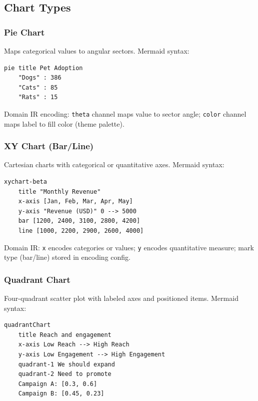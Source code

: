 \subsection{Chart Types}

\subsubsection{Pie Chart}

Maps categorical values to angular sectors. Mermaid syntax:

\begin{Verbatim}[fontsize=\small]
pie title Pet Adoption
    "Dogs" : 386
    "Cats" : 85
    "Rats" : 15
\end{Verbatim}

\noindent Domain IR encoding: \texttt{theta} channel maps value to sector angle;
\texttt{color} channel maps label to fill color (theme palette).

\subsubsection{XY Chart (Bar/Line)}

Cartesian charts with categorical or quantitative axes. Mermaid syntax:

\begin{Verbatim}[fontsize=\small]
xychart-beta
    title "Monthly Revenue"
    x-axis [Jan, Feb, Mar, Apr, May]
    y-axis "Revenue (USD)" 0 --> 5000
    bar [1200, 2400, 3100, 2800, 4200]
    line [1000, 2200, 2900, 2600, 4000]
\end{Verbatim}

\noindent Domain IR: \texttt{x} encodes categories or values; \texttt{y} encodes quantitative
measure; mark type (bar/line) stored in encoding config.

\subsubsection{Quadrant Chart}

Four-quadrant scatter plot with labeled axes and positioned items. Mermaid syntax:

\begin{Verbatim}[fontsize=\small]
quadrantChart
    title Reach and engagement
    x-axis Low Reach --> High Reach
    y-axis Low Engagement --> High Engagement
    quadrant-1 We should expand
    quadrant-2 Need to promote
    Campaign A: [0.3, 0.6]
    Campaign B: [0.45, 0.23]
\end{Verbatim}

